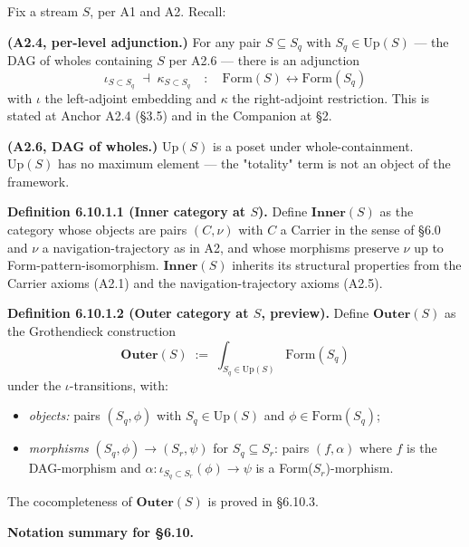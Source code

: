 \documentclass[11pt, openany]{book}
\begin{document}
Fix a stream $S$, per A1 and A2. Recall:

\textbf{(A2.4, per-level adjunction.)} For any pair $S \subseteq S_q$ with $S_q \in \mathrm{Up}(S)$ --- the DAG of wholes containing $S$ per A2.6 --- there is an adjunction
\[
\iota_{S \subset S_q} \;\dashv\; \kappa_{S \subset S_q}
\quad : \quad \mathrm{Form}(S) \longleftrightarrow \mathrm{Form}(S_q)
\]
with $\iota$ the left-adjoint embedding and $\kappa$ the right-adjoint restriction. This is stated at Anchor A2.4 (§3.5) and in the Companion at §2.

\textbf{(A2.6, DAG of wholes.)} $\mathrm{Up}(S)$ is a poset under whole-containment. $\mathrm{Up}(S)$ has no maximum element --- the "totality" term is not an object of the framework.

\textbf{Definition 6.10.1.1 (Inner category at $S$).} Define $\mathbf{Inner}(S)$ as the category whose objects are pairs $(C, \nu)$ with $C$ a Carrier in the sense of §6.0 and $\nu$ a navigation-trajectory as in A2, and whose morphisms preserve $\nu$ up to Form-pattern-isomorphism. $\mathbf{Inner}(S)$ inherits its structural properties from the Carrier axioms (A2.1) and the navigation-trajectory axioms (A2.5).

\textbf{Definition 6.10.1.2 (Outer category at $S$, preview).} Define $\mathbf{Outer}(S)$ as the Grothendieck construction
\[
\mathbf{Outer}(S) \;:=\; \int_{S_q \in \mathrm{Up}(S)} \mathrm{Form}(S_q)
\]
under the $\iota$-transitions, with:

\begin{itemize}
\item \textit{objects:} pairs $(S_q, \phi)$ with $S_q \in \mathrm{Up}(S)$ and $\phi \in \mathrm{Form}(S_q)$;
\item \textit{morphisms} $(S_q, \phi) \to (S_r, \psi)$ for $S_q \subseteq S_r$: pairs $(f, \alpha)$ where $f$ is the DAG-morphism and $\alpha : \iota_{S_q \subset S_r}(\phi) \to \psi$ is a Form($S_r$)-morphism.
\end{itemize}

The cocompleteness of $\mathbf{Outer}(S)$ is proved in §6.10.3.

\textbf{Notation summary for §6.10.}
\end{document}
